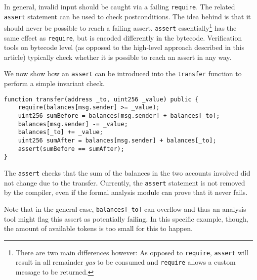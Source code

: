 In general, invalid input should be caught via a failing \texttt{require}.
The related \texttt{assert} statement can be used to check postconditions.
The idea behind is that it should never be possible to reach a failing
assert.
\texttt{assert} essentially\footnote{There are two main differences however: As opposed to \texttt{require},
\texttt{assert} will result in all remainder \emph{gas} to be consumed and \texttt{require} allows a custom message to be returned.}
has the same effect as \texttt{require}, but
is encoded differently in the bytecode. Verification tools on bytecode
level (as opposed to the high-level approach described in this article)
typically check whether it is possible to reach an assert in any way.

We now show how an \texttt{assert} can be introduced into the \texttt{transfer} function
to perform a simple invariant check.
\begin{verbatim}
function transfer(address _to, uint256 _value) public {
    require(balances[msg.sender] >= _value);
    uint256 sumBefore = balances[msg.sender] + balances[_to];
    balances[msg.sender] -= _value;
    balances[_to] += _value;
    uint256 sumAfter = balances[msg.sender] + balances[_to];
    assert(sumBefore == sumAfter);
}
\end{verbatim}

The \texttt{assert} checks that the sum of the balances in the two
accounts involved did not change due to the transfer. Currently,
the \texttt{assert} statement is not removed by the compiler, even
if the formal analysis module can prove that it never fails.

Note that in the general case, \verb+balances[_to]+ can overflow
and thus an analysis tool might flag this assert as potentially
failing. In this specific example, though, the amount of available tokens
is too small for this to happen.
